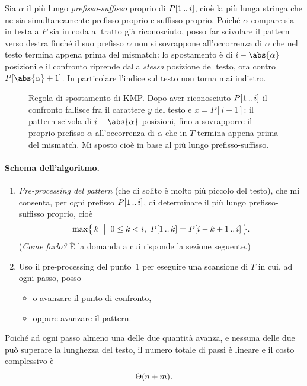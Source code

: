Sia $\alpha$ il più lungo \emph{prefisso-suffisso} proprio di $P[1\,..\,i]$, cioè
la più lunga stringa che ne sia simultaneamente prefisso proprio e suffisso
proprio. Poiché $\alpha$ compare sia in testa a $P$ sia in coda al tratto già
riconosciuto, posso far scivolare il pattern verso destra finché il suo prefisso
$\alpha$ non si sovrappone all'occorrenza di $\alpha$ che nel testo termina
appena prima del mismatch: lo spostamento è di $i-\abs{\alpha}$ posizioni e il
confronto riprende dalla \emph{stessa} posizione del testo, ora contro
$P[\abs{\alpha}+1]$. In particolare l'indice sul testo non torna mai indietro.

\begin{figure}[H]
  \centering
  
  \caption{Regola di spostamento di KMP. Dopo aver riconosciuto $P[1\,..\,i]$ il
  confronto fallisce fra il carattere $y$ del testo e $x=P[i+1]$: il pattern
  scivola di $i-\abs{\alpha}$ posizioni, fino a sovrapporre il proprio prefisso
  $\alpha$ all'occorrenza di $\alpha$ che in $T$ termina appena prima del
  mismatch. Mi sposto cioè in base al più lungo prefisso-suffisso.}
  \label{fig:kmp-shift}
\end{figure}

\paragraph{Schema dell'algoritmo.}
\begin{enumerate}
  \item \emph{Pre-processing del pattern} (che di solito è molto più piccolo del
    testo), che mi consenta, per ogni prefisso $P[1\,..\,i]$, di determinare il più
    lungo prefisso-suffisso proprio, cioè
    \[
      \max\bigl\{\, k \;\bigm|\; 0\le k<i,\ \pre{P}{k} = \sub{P}{i-k+1}{i} \,\bigr\}.
    \]
    (\emph{Come farlo?} È la domanda a cui risponde la sezione seguente.)
  \item Uso il pre-processing del punto~1 per eseguire una scansione di $T$ in
    cui, ad ogni passo, posso
    \begin{itemize}
      \item o avanzare il punto di confronto,
      \item oppure avanzare il pattern.
    \end{itemize}
\end{enumerate}

\noindent Poiché ad ogni passo almeno una delle due quantità avanza, e nessuna
delle due può superare la lunghezza del testo, il numero totale di passi è
lineare e il costo complessivo è
\[
  \Theta(n+m).
\]


